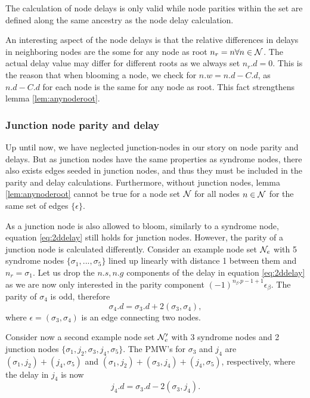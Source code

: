 \begin{lemma}\label{lem:nodecalc_ancestrypath}
 The calculation of node delays is only valid while node parities within the set are defined along the same ancestry as the node delay calculation.
\end{lemma}

An interesting aspect of the node delays is that the relative differences in delays in neighboring nodes are the some for any node as root $n_r = n \forall n \in \mathcal{N}$. The actual delay value may differ for different roots as we always set $n_r.d =0$. This is the reason that when blooming a node, we check for $n.w = n.d - C.d$, as $n.d - C.d$ for each node is the same for any node as root. This fact strengthens lemma \ref{lem:anynoderoot}.

\subsubsection{Junction node parity and delay}

Up until now, we have neglected junction-nodes in our story on node parity and delays. But as junction nodes have the same properties as syndrome nodes, there also exists edges seeded in junction nodes, and thus they must be included in the parity and delay calculations. Furthermore, without junction nodes, lemma \ref{lem:anynoderoot} cannot be true for a node set $\mathcal{N}$ for all nodes $n \in \mathcal{N}$ for the same set of edges $\{\epsilon\}$.

As a junction node is also allowed to bloom, similarly to a syndrome node, equation \ref{eq:2ddelay} still holds for junction nodes. However, the parity of a junction node is calculated differently. Consider an example node set $\mathcal{N}_e$ with 5 syndrome nodes $\{\sigma_1,...,\sigma_5\}$ lined up linearly with distance 1 between them and $n_r = \sigma_1$. Let us drop the $n.s, n.g$ components of the delay in equation \ref{eq:2ddelay} as we are now only interested in the parity component $(-1)^{n_\beta.p-1+1}\epsilon_\beta$. The parity of $\sigma_4$ is odd, therefore
\begin{equation*}
  \sigma_4.d = \sigma_3.d + 2(\sigma_3, \sigma_4),
\end{equation*}
where $\epsilon = (\sigma_3, \sigma_4)$ is an edge connecting two nodes.

Consider now a second example node set $\mathcal{N}_e'$ with 3 syndrome nodes and 2 junction nodes $\{\sigma_1, j_2, \sigma_3, j_4, \sigma_5\}$. The PMW's for $\sigma_3$ and $j_4$ are $(\sigma_1, j_2) + (j_4, \sigma_5)$ and  $(\sigma_1, j_2) + (\sigma_3, j_4) + (j_4, \sigma_5)$, respectively, where the delay in $j_4$ is now
\begin{equation*}
  j_4.d = \sigma_3.d - 2(\sigma_3, j_4).
\end{equation*}

